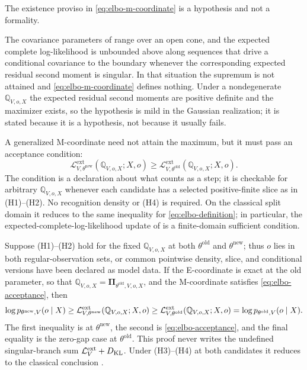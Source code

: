 The existence proviso in \eqref{eq:elbo-m-coordinate} is a hypothesis and not a formality. 

The covariance parameters of  range over an open cone, and
the expected complete log-likelihood is unbounded above along sequences that
drive a conditional covariance to the boundary whenever the corresponding
expected residual second moment is singular. In that situation the supremum
is not attained and \eqref{eq:elbo-m-coordinate} defines nothing. Under a
nondegenerate \(\mathbb Q_{V,o,X}\) the expected residual second moments are positive
definite and the maximizer exists, so the hypothesis is mild in the Gaussian
realization; it is stated because it is a hypothesis, not because it usually
fails. 

A generalized M-coordinate need not attain the maximum, but it must pass an acceptance condition:
\begin{equation}
\mathcal L_{V,\theta^{\mathrm{new}}}^{\mathrm{ext}}
(\mathbb Q_{V,o,X};X,o)
\geq
\mathcal L_{V,\theta^{\mathrm{old}}}^{\mathrm{ext}}
(\mathbb Q_{V,o,X};X,o).
\label{eq:elbo-acceptance}
\end{equation}
The condition is a declaration about what counts as a step; it is checkable
for arbitrary \(\mathbb Q_{V,o,X}\) whenever each candidate has a selected positive-finite
slice as in (H1)--(H2). No recognition density or (H4) is required. On the
classical split domain it reduces to the same inequality for
\eqref{eq:elbo-definition}; in particular, the expected-complete-log-likelihood
update of  is a finite-domain sufficient
condition. 

Suppose (H1)--(H2) hold for the fixed \(\mathbb Q_{V,o,X}\) at both \(\theta^{\mathrm{old}}\) and \(\theta^{\mathrm{new}}\); thus \(o\) lies in both regular-observation sets, or common pointwise density, slice, and conditional versions have been declared as model data. If the E-coordinate is exact at the old parameter, so that \(\mathbb Q_{V,o,X}=\boldsymbol\Pi_{\theta^{\mathrm{old}},V,o,X}\), and the M-coordinate satisfies \eqref{eq:elbo-acceptance}, then
\begin{equation}
\log p_{\theta^{\mathrm{new}},V}(o\mid X)
\geq
\mathcal L_{V,\theta^{\mathrm{new}}}^{\mathrm{ext}}
(\mathbb Q_{V,o,X};X,o)
\geq
\mathcal L_{V,\theta^{\mathrm{old}}}^{\mathrm{ext}}
(\mathbb Q_{V,o,X};X,o)
=\log p_{\theta^{\mathrm{old}},V}(o\mid X).
\label{eq:elbo-monotonicity}
\end{equation}
The first inequality is  at \(\theta^{\mathrm{new}}\),
the second is \eqref{eq:elbo-acceptance}, and the final equality is the zero-gap
case at \(\theta^{\mathrm{old}}\). This proof never writes the undefined
singular-branch sum \(\mathcal L_V^{\mathrm{ext}}+D_{\mathrm{KL}}\). Under (H3)--(H4) at both
candidates it reduces to the classical conclusion
\citep{Dempster1977,Neal1998}. 

